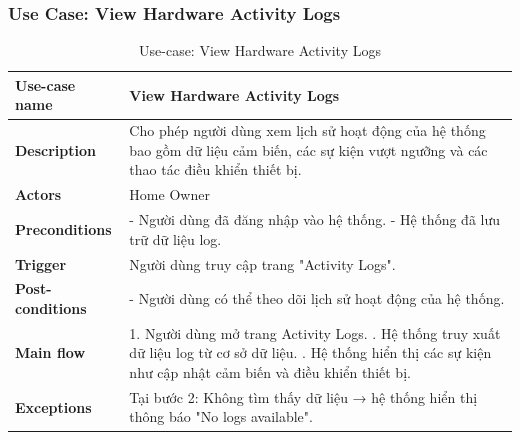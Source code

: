 \documentclass[a4paper,twoside]{article}
\begin{document}
\subsubsection{Use Case: View Hardware Activity Logs}
\begin{table}[H]
\centering
\begin{tabular}{|p{4cm}|p{11cm}|}
\hline
\textbf{Use-case name} & View Hardware Activity Logs \\ \hline

\textbf{Description} &
Cho phép người dùng xem lịch sử hoạt động của hệ thống
bao gồm dữ liệu cảm biến, các sự kiện vượt ngưỡng
và các thao tác điều khiển thiết bị. \\ \hline

\textbf{Actors} &
Home Owner \\ \hline

\textbf{Preconditions} &
- Người dùng đã đăng nhập vào hệ thống. \newline
- Hệ thống đã lưu trữ dữ liệu log. \\ \hline

\textbf{Trigger} &
Người dùng truy cập trang "Activity Logs". \\ \hline

\textbf{Post-conditions} &
- Người dùng có thể theo dõi lịch sử hoạt động của hệ thống. \\ \hline

\textbf{Main flow} &
1. Người dùng mở trang Activity Logs. \newline
2. Hệ thống truy xuất dữ liệu log từ cơ sở dữ liệu. \newline
3. Hệ thống hiển thị các sự kiện như cập nhật cảm biến
và điều khiển thiết bị. \\ \hline

\textbf{Exceptions} &
Tại bước 2: Không tìm thấy dữ liệu → hệ thống hiển thị thông báo "No logs available". \\ \hline
\end{tabular}
\caption{Use-case: View Hardware Activity Logs}
\end{table}


\end{document}
